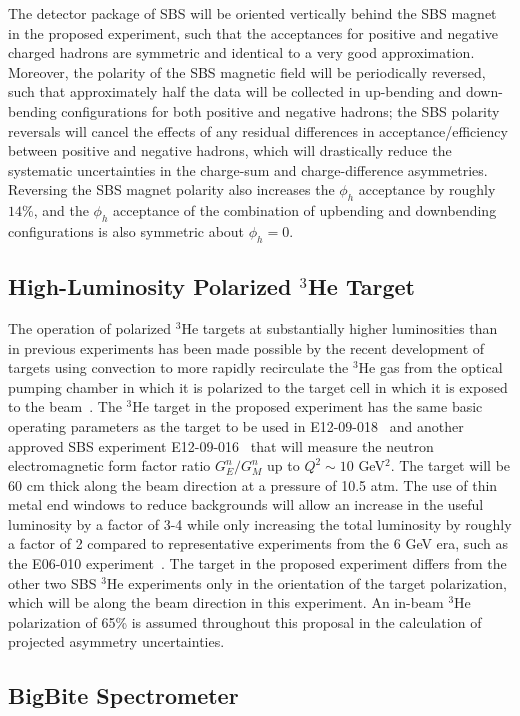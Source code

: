 The detector package of SBS will be oriented vertically behind the SBS magnet in the proposed experiment, such that the acceptances for positive and negative charged hadrons are symmetric and identical to a very good approximation. Moreover, the polarity of the SBS magnetic field will be periodically reversed, such that approximately half the data will be collected in up-bending and down-bending configurations for both positive and negative hadrons; the SBS polarity reversals will cancel the effects of any residual differences in acceptance/efficiency between positive and negative hadrons, which will drastically reduce the systematic uncertainties in the charge-sum and charge-difference asymmetries. Reversing the SBS magnet polarity also increases the $\phi_h$ acceptance by roughly $14\%$, and the $\phi_h$ acceptance of the combination of upbending and downbending configurations is also symmetric about $\phi_h = 0$. 
\subsection{High-Luminosity Polarized $^3$He Target}

The operation of polarized $^3$He targets at substantially higher luminosities than in previous experiments has been made possible by the recent development of targets using convection to more rapidly recirculate the $^3$He gas from the optical pumping chamber in which it is polarized to the target cell in which it is exposed to the beam~\cite{Helium3_target}. The $^3$He target in the proposed experiment has the same basic operating parameters as the target to be used in E12-09-018~\cite{SBS_SIDIS} and another approved SBS experiment E12-09-016~\cite{GEN2} that will measure the neutron electromagnetic form factor ratio $G_E^n/G_M^n$ up to $Q^2 \sim 10$ GeV$^2$. The target will be 60 cm thick along the beam direction at a pressure of 10.5 atm. The use of thin metal end windows to reduce backgrounds will allow an increase in the useful luminosity by a factor of 3-4 while only increasing the total luminosity by roughly a factor of 2 compared to representative experiments from the 6 GeV era, such as the E06-010 experiment~\cite{E06010_AUT_PRL}. The target in the proposed experiment differs from the other two SBS $^3$He experiments only in the orientation of the target polarization, which will be along the beam direction in this experiment. An in-beam $^3$He  polarization of 65\% is assumed throughout this proposal in the calculation of projected asymmetry uncertainties. 
\subsection{BigBite Spectrometer}

